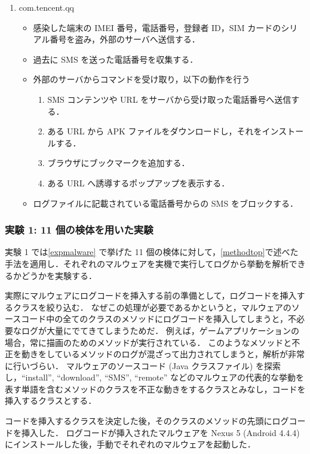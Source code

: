 \begin{enumerate}
\item com.tencent.qq
	\begin{itemize}
	\item 感染した端末の IMEI 番号，電話番号，登録者 ID，SIM カードのシリアル番号を盗み，外部のサーバへ送信する．
	\item 過去に SMS を送った電話番号を収集する．
	\item 外部のサーバからコマンドを受け取り，以下の動作を行う
	\begin{enumerate}
		\item SMS コンテンツや URL をサーバから受け取った電話番号へ送信する．
		\item ある URL から APK ファイルをダウンロードし，それをインストールする．
		\item ブラウザにブックマークを追加する．
		\item ある URL へ誘導するポップアップを表示する．
	\end{enumerate}
	\item ログファイルに記載されている電話番号からの SMS をブロックする．
	\end{itemize}
\end{enumerate}

\subsubsection{実験 1: 11 個の検体を用いた実験}
\label{exp1}
実験 1 では\ref{expmalware} で挙げた 11 個の検体に対して，\ref{methodtop}で述べた手法を適用し．それぞれのマルウェアを実機で実行してログから挙動を解析できるかどうかを実験する．

実際にマルウェアにログコードを挿入する前の準備として，ログコードを挿入するクラスを絞り込む．
なぜこの処理が必要であるかというと，マルウェアのソースコード中の全てのクラスのメソッドにログコードを挿入してしまうと，不必要なログが大量にでてきてしまうためだ．
例えば，ゲームアプリケーションの場合，常に描画のためのメソッドが実行されている．
このようなメソッドと不正を動きをしているメソッドのログが混ざって出力されてしまうと，解析が非常に行いづらい．
マルウェアのソースコード (Java クラスファイル) を探索し，``install'', ``download'', ``SMS'', ``remote'' などのマルウェアの代表的な挙動を表す単語を含むメソッドのクラスを不正な動きをするクラスとみなし，コードを挿入するクラスとする．

コードを挿入するクラスを決定した後，そのクラスのメソッドの先頭にログコードを挿入した．
ログコードが挿入されたマルウェアを Nexus 5 (Android 4.4.4) にインストールした後，手動でそれぞれのマルウェアを起動した．

